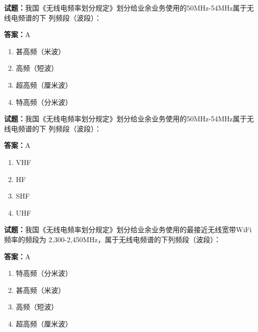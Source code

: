 \documentclass{ctexbook}
\begin{document}




\vspace{1em}

\textbf{试题：}我国《无线电频率划分规定》划分给业余业务使用的50MHz-54MHz属于无线电频谱的下
列频段（波段）： 

\textbf{答案：}A 

\begin{enumerate}[leftmargin=3em]
  \item 甚高频（米波） 

  \item 高频（短波） 

  \item 超高频（厘米波） 

  \item 特高频（分米波） 

\end{enumerate}





\vspace{1em}

\textbf{试题：}我国《无线电频率划分规定》划分给业余业务使用的50MHz-54MHz属于无线电频谱的下
列频段（波段）： 

\textbf{答案：}A 

\begin{enumerate}[leftmargin=3em]
  \item VHF 

  \item HF 

  \item SHF 

  \item UHF 

\end{enumerate}





\vspace{1em}

\textbf{试题：}我国《无线电频率划分规定》划分给业余业务使用的最接近无线宽带WiFi频率的频段为
2,300-2,450MHz，属于无线电频谱的下列频段（波段）： 

\textbf{答案：}A 

\begin{enumerate}[leftmargin=3em]
  \item 特高频（分米波） 

  \item 甚高频（米波） 

  \item 高频（短波） 

  \item 超高频（厘米波） 

\end{enumerate}
\end{document}

